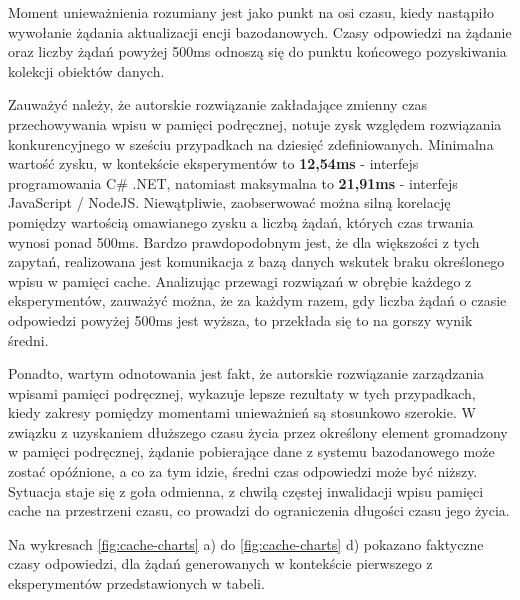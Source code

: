 Moment unieważnienia rozumiany jest jako punkt na osi czasu, kiedy nastąpiło wywołanie żądania aktualizacji encji bazodanowych. Czasy odpowiedzi na żądanie oraz liczby żądań powyżej 500ms odnoszą się do punktu końcowego pozyskiwania kolekcji obiektów danych.

Zauważyć należy, że autorskie rozwiązanie zakładające zmienny czas przechowywania wpisu w pamięci podręcznej, notuje zysk względem rozwiązania konkurencyjnego w sześciu przypadkach na dziesięć zdefiniowanych. Minimalna wartość zysku, w kontekście eksperymentów to \textbf{12,54ms} - interfejs programowania C\# .NET, natomiast maksymalna to \textbf{21,91ms} - interfejs JavaScript / NodeJS. Niewątpliwie, zaobserwować można silną korelację pomiędzy wartością omawianego zysku a liczbą żądań, których czas trwania wynosi ponad 500ms. Bardzo prawdopodobnym jest, że dla większości z tych zapytań, realizowana jest komunikacja z bazą danych wskutek braku określonego wpisu w pamięci cache. Analizując przewagi rozwiązań w obrębie każdego z eksperymentów, zauważyć można, że za każdym razem, gdy liczba żądań o czasie odpowiedzi powyżej 500ms jest wyższa, to przekłada się to na gorszy wynik średni.

Ponadto, wartym odnotowania jest fakt, że autorskie rozwiązanie zarządzania wpisami pamięci podręcznej, wykazuje lepsze rezultaty w tych przypadkach, kiedy zakresy pomiędzy momentami unieważnień są stosunkowo szerokie. W związku z uzyskaniem dłuższego czasu życia przez określony element gromadzony w pamięci podręcznej, żądanie pobierające dane z systemu bazodanowego może zostać opóźnione, a co za tym idzie, średni czas odpowiedzi może być niższy. Sytuacja staje się z goła odmienna, z chwilą częstej inwalidacji wpisu pamięci cache na przestrzeni czasu, co prowadzi do ograniczenia długości czasu jego życia.

Na wykresach \ref{fig:cache-charts} a) do \ref{fig:cache-charts} d) pokazano faktyczne czasy odpowiedzi, dla żądań generowanych w kontekście pierwszego z eksperymentów przedstawionych w tabeli.

